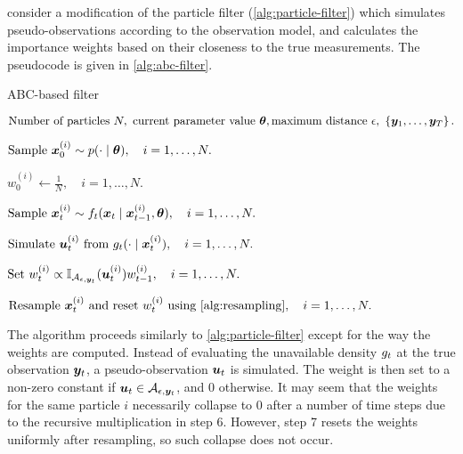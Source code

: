\cite{jasra-filtering} consider a modification of the particle filter (\autoref{alg:particle-filter}) which simulates pseudo-observations according to the observation model, and calculates the importance weights based on their closeness to the true measurements. The pseudocode is given in \autoref{alg:abc-filter}.

\begin{algorithm}[ht]
    \caption{ABC-based filter}
    \label{alg:abc-filter}
    \begin{algorithmic}[1]
        \Input $\text{Number of particles } N,\ \text{current parameter value } \btheta, \text{maximum distance } \epsilon,\ \left\{\by_1, \ldots, \by_T\right\}.$
        
        \State $\text{Sample } \bm{x}_0^{(i)} \sim p(\cdot \mid \bm{\theta}), \quad i = 1, \ldots, N.$ 
        
        \State $w_0^{(i)} \gets \frac{1}{N}, \quad i = 1, \ldots, N.$ 
        
        \State $\text{Sample } \bm{x}_t^{(i)} \sim f_t(\bm{x}_t \mid \bm{x}_{t-1}^{(i)}, \bm{\theta}), \quad i = 1, \ldots, N.$ 
        
        \State $\text{Simulate } \bm{u}_t^{(i)} \text{ from } g_t(\cdot \mid \bm{x}_t^{(i)}), \quad i = 1, \ldots, N.$ 
        
        \State $\text{Set } w_t^{(i)} \propto \mathbb{I}_{\mathcal{A}_{\epsilon, \bm{y}_t}}(\bm{u}_t^{(i)}) w_{t-1}^{(i)}, \quad i = 1, \ldots, N.$
        
        \State $\text{Resample } \bx_t^{(i)} \text{ and reset } w_t^{(i)} \text{ using \autoref{alg:resampling}}, \quad i = 1, \ldots, N.$
        \EndFor
    \end{algorithmic}
\end{algorithm}

The algorithm proceeds similarly to \autoref{alg:particle-filter} except for the way the weights are computed. Instead of evaluating the unavailable density $g_t$ at the true observation $\bm{y}_t$, a pseudo-observation $\bm{u}_t$ is simulated. The weight is then set to a non-zero constant if $\bm{u}_t \in \mathcal{A}_{\epsilon, \bm{y}_t}$, and 0 otherwise. It may seem that the weights for the same particle $i$ necessarily collapse to 0 after a number of time steps due to the recursive multiplication in step 6. However, step 7 resets the weights uniformly after resampling, so such collapse does not occur.

